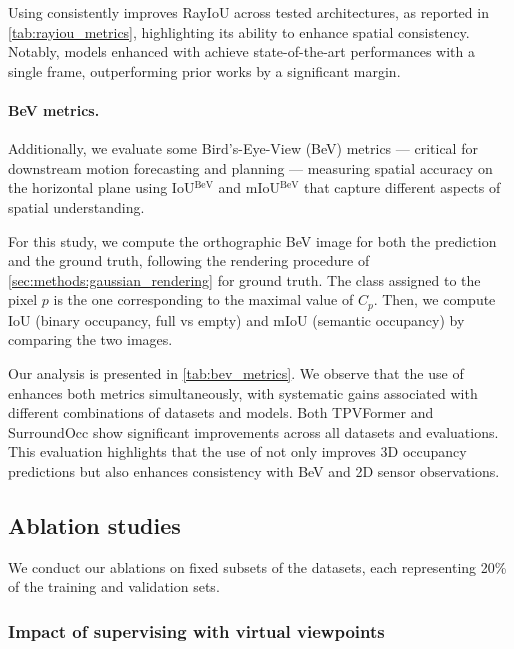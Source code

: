 Using \method{} consistently improves RayIoU across tested architectures, as reported in \autoref{tab:rayiou_metrics}, highlighting its ability to enhance spatial consistency.
{Notably, models enhanced with \method{} achieve state-of-the-art performances with a single frame, outperforming prior works by a significant margin.} %


\paragraph{BeV metrics.}

Additionally, we evaluate some Bird’s-Eye-View (BeV) metrics --- critical for {downstream} motion forecasting and planning --- measuring spatial accuracy {on the horizontal plane} using IoU$^\text{BeV}$ and mIoU$^\text{BeV}$ that capture different aspects of spatial understanding.

{
For this study, we compute the orthographic BeV image for both the prediction and the ground truth, following the rendering procedure of \autoref{sec:methods:gaussian_rendering} for ground truth.
The class assigned to the pixel $p$ is the one corresponding to the maximal value of $C_p$.
Then, we compute IoU (binary occupancy, full vs empty) and mIoU (semantic occupancy) by comparing the two images.
}


Our analysis is presented in \autoref{tab:bev_metrics}.
We observe that the use of \method{} enhances {both} metrics simultaneously, with systematic gains associated with different combinations of datasets and models. 
Both TPVFormer and SurroundOcc show significant improvements across all datasets and evaluations.
This evaluation highlights that the use of \method{} not only improves 3D occupancy predictions but also enhances consistency with BeV and 2D sensor observations.

\subsection{Ablation studies}

{We conduct our ablations} on {fixed} subsets of the datasets{, each representing 20\% of the training and validation sets.} 

\label{sec:exp:ablations}





\subsubsection{Impact of supervising with virtual viewpoints}


